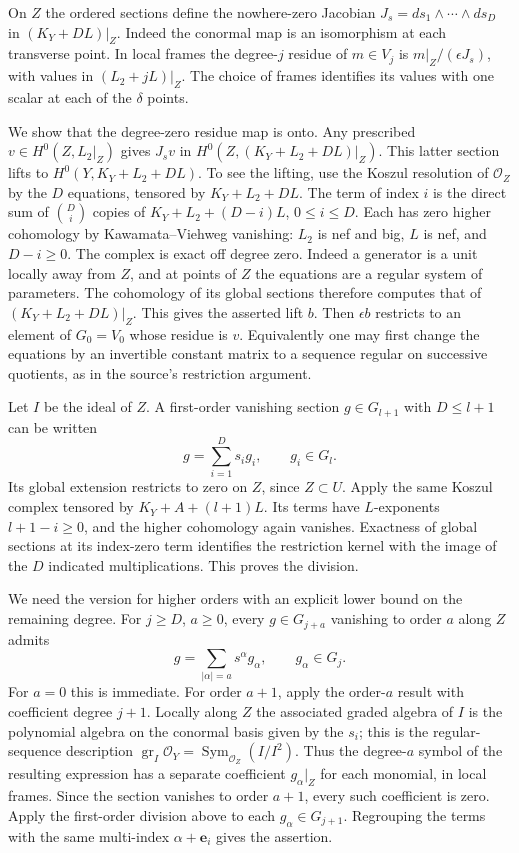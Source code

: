 On \(Z\) the ordered sections define the nowhere-zero Jacobian
\(J_s=ds_1\wedge\cdots\wedge ds_D\) in
\((K_Y+DL)|_Z\). Indeed the conormal map is an isomorphism at
each transverse point. In local frames the degree-\(j\) residue
of \(m\in V_j\) is \(m|_Z/(\epsilon J_s)\), with values in
\((L_2+jL)|_Z\). The choice of frames identifies its values with
one scalar at each of the \(\delta\) points.

We show that the degree-zero residue map is onto. Any prescribed
\(v\in H^0(Z,L_2|_Z)\) gives \(J_s v\) in
\(H^0(Z,(K_Y+L_2+DL)|_Z)\). This latter section lifts to
\(H^0(Y,K_Y+L_2+DL)\). To see the lifting, use the Koszul
resolution of \(\mathcal O_Z\) by the \(D\) equations, tensored by
\(K_Y+L_2+DL\). The term of index \(i\) is the direct sum of
\(\binom Di\) copies of \(K_Y+L_2+(D-i)L\), \(0\le i\le D\).
Each has zero higher cohomology by Kawamata--Viehweg vanishing:
\(L_2\) is nef and big, \(L\) is nef, and \(D-i\ge0\). The complex
is exact off degree zero. Indeed a generator is a unit locally away
from \(Z\), and at points of \(Z\) the equations are a regular system
of parameters. The cohomology of its global sections therefore computes
that of \((K_Y+L_2+DL)|_Z\). This gives the asserted lift \(b\).
Then \(\epsilon b\) restricts to an element of \(G_0=V_0\) whose
residue is \(v\). Equivalently one may first change the equations by
an invertible constant matrix to a sequence regular on successive
quotients, as in the source's restriction argument.

Let \(I\) be the ideal of \(Z\). A first-order vanishing section
\(g\in G_{l+1}\) with \(D\le l+1\) can be written
\[
                        g=\sum_{i=1}^D s_i g_i,\qquad g_i\in G_l .
\]
Its global extension restricts to zero on \(Z\), since \(Z\subset U\).
Apply the same Koszul complex tensored by \(K_Y+A+(l+1)L\).
Its terms have \(L\)-exponents \(l+1-i\ge0\), and the higher
cohomology again vanishes. Exactness of global sections at its
index-zero term identifies the restriction kernel with the image
of the \(D\) indicated multiplications. This proves the division.

We need the version for higher orders with an explicit lower bound
on the remaining degree. For \(j\ge D\), \(a\ge0\), every
\(g\in G_{j+a}\) vanishing to order \(a\) along \(Z\) admits
\[
                       g=\sum_{|\alpha|=a}s^\alpha g_\alpha,
                       \qquad g_\alpha\in G_j .
\]
For \(a=0\) this is immediate. For order \(a+1\), apply the
order-\(a\) result with coefficient degree \(j+1\).
Locally along \(Z\) the associated graded algebra of \(I\) is the
polynomial algebra on the conormal basis given by the \(s_i\);
this is the regular-sequence description
\(\operatorname{gr}_I\mathcal O_Y=\operatorname{Sym}_{\mathcal O_Z}
(I/I^2)\). Thus the degree-\(a\) symbol of the resulting expression
has a separate coefficient \(g_\alpha|_Z\) for each monomial,
in local frames. Since the section vanishes to order \(a+1\),
every such coefficient is zero. Apply the first-order division
above to each \(g_\alpha\in G_{j+1}\). Regrouping the terms with
the same multi-index \(\alpha+\mathbf e_i\) gives the assertion.

